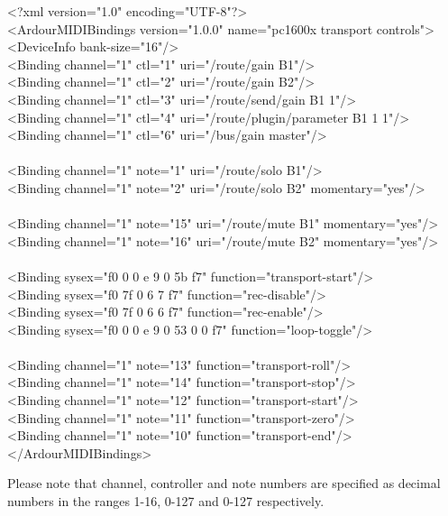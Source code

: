\documentclass[10pt,a4paper]{book}
\begin{document}
{\begin{listing}
<?xml version="1.0" encoding="UTF-8"?>\\
<ArdourMIDIBindings version="1.0.0" name="pc1600x transport controls">\\
<DeviceInfo bank-size="16"/>\\
<Binding channel="1" ctl="1"   uri="/route/gain B1"/>\\
<Binding channel="1" ctl="2"   uri="/route/gain B2"/>\\
<Binding channel="1" ctl="3"   uri="/route/send/gain B1 1"/>\\
<Binding channel="1" ctl="4"   uri="/route/plugin/parameter B1 1 1"/>\\
<Binding channel="1" ctl="6"   uri="/bus/gain master"/>\\
\\
<Binding channel="1" note="1"  uri="/route/solo B1"/>\\
<Binding channel="1" note="2"  uri="/route/solo B2" momentary="yes"/>\\
\\
<Binding channel="1" note="15"  uri="/route/mute B1" momentary="yes"/>\\
<Binding channel="1" note="16"  uri="/route/mute B2" momentary="yes"/>\\
\\
<Binding sysex="f0 0 0 e 9 0 5b f7" function="transport-start"/>\\
<Binding sysex="f0 7f 0 6 7 f7" function="rec-disable"/>\\
<Binding sysex="f0 7f 0 6 6 f7" function="rec-enable"/>\\
<Binding sysex="f0 0 0 e 9 0 53 0 0 f7" function="loop-toggle"/>\\
\\
<Binding channel="1" note="13" function="transport-roll"/>\\
<Binding channel="1" note="14" function="transport-stop"/>\\
<Binding channel="1" note="12" function="transport-start"/>\\
<Binding channel="1" note="11" function="transport-zero"/>\\
<Binding channel="1" note="10" function="transport-end"/>\\
</ArdourMIDIBindings>\\
\end{listing}

Please note that channel, controller and note numbers are specified as
decimal numbers in the ranges 1-16, 0-127 and 0-127 respectively.


}
\end{document}
